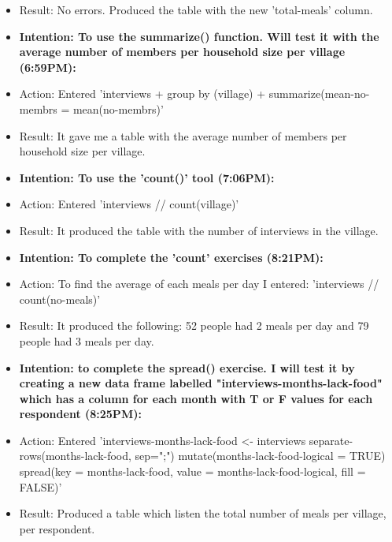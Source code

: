 \documentclass[a4paper,12pt]{article}
\begin{document}
\begin{itemize}
\item Result: No errors. Produced the table with the new 'total-meals' column. 


\item \textbf{Intention: To use the summarize() function. Will test it with the average number of members per household size per village (6:59PM):}


\item Action: Entered 'interviews + group by (village) + summarize(mean-no-membrs = mean(no-membrs)' 


\item Result: It gave me a table with the average number of members per household size per village.


\item \textbf{Intention: To use the 'count()' tool (7:06PM):}


\item Action: Entered 'interviews // count(village)'


\item Result: It produced the table with the number of interviews in the village. 


\item \textbf{Intention: To complete the 'count' exercises (8:21PM):}


\item Action: To find the average of each meals per day I entered: 'interviews // count(no-meals)'
    

\item Result: It produced the following: 52 people had 2 meals per day and 79 people had 3 meals per day. 


\item \textbf{Intention: to complete the spread() exercise. I will test it by creating a new data frame labelled "interviews-months-lack-food" which has a column for each month with T or F values for each respondent (8:25PM):}


\item Action: Entered 'interviews-months-lack-food <- interviews separate-rows(months-lack-food, sep=";") mutate(months-lack-food-logical  = TRUE) spread(key = months-lack-food, value = months-lack-food-logical, fill = FALSE)'


\item Result: Produced a table which listen the total number of meals per village, per respondent. 


\end{itemize}
\end{document}
